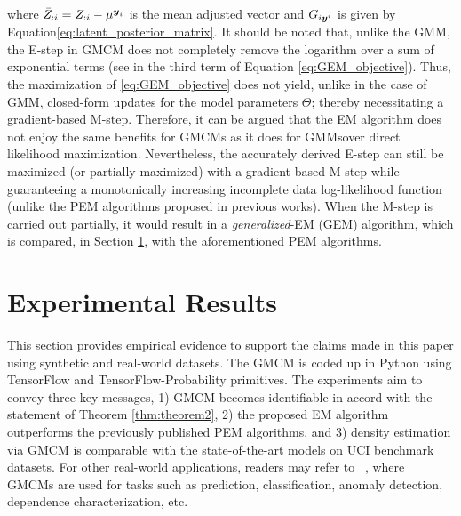\documentclass{article}
\theoremstyle{plain}
\theoremstyle{definition}
\theoremstyle{remark}
\begin{document}
where $\bar{Z}_{:{i}}=Z_{:i}-\mu^{\boldsymbol{y}_i}$ is the mean adjusted vector and $G_{i\boldsymbol{y}^i}$ is given by Equation\eqref{eq:latent_posterior_matrix}. It should be noted that, unlike the GMM, the E-step in GMCM does not completely remove the logarithm over a sum of exponential terms (see in the third term of Equation \ref{eq:GEM_objective}). Thus, the maximization of \eqref{eq:GEM_objective} does not yield, unlike in the case of GMM, closed-form updates for the model parameters $\Theta$; thereby necessitating a gradient-based M-step. Therefore, it can be argued that the EM algorithm does not enjoy the same benefits for GMCMs \textemdash as it does for GMMs\textemdash over direct likelihood maximization. Nevertheless, the accurately derived E-step can still be maximized (or partially maximized) with a gradient-based M-step while guaranteeing a monotonically increasing incomplete data log-likelihood function (unlike the PEM algorithms proposed in previous works). When the M-step is carried out partially, it would result in a \emph{generalized}-EM (GEM) algorithm, which is compared, in Section \ref{sec:Experimental}, with the aforementioned PEM algorithms.

\section{Experimental Results}\label{sec:Experimental}
This section provides empirical evidence to support the claims made in this paper using synthetic and real-world datasets. The GMCM is coded up in Python using TensorFlow and TensorFlow-Probability primitives.  The experiments aim to convey three key messages, 1) GMCM becomes identifiable in accord with the statement of Theorem \ref{thm:theorem2}, 2) the proposed EM algorithm outperforms the previously published PEM algorithms, and 3) density estimation via GMCM is comparable with the state-of-the-art models on UCI benchmark datasets. For other real-world applications, readers may refer to ~\cite{Bilgrau2012quantification,Wang2014,Yu2013GMCMWindPred,Bayestehtashk2015}, where GMCMs are used for tasks such as prediction, classification, anomaly detection, dependence characterization, etc.
\end{document}
